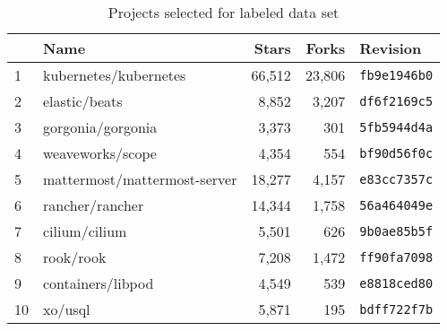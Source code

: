 \begin{table}[htp!]
    \centering
    \caption{Projects selected for labeled data set}
    \label{tbl:dataset-projects}
    \begin{tabular}{llrrl}
    {} & \textbf{Name} &  \textbf{Stars} &  \textbf{Forks} &    \textbf{Revision} \\
    \hline
    1  &         kubernetes/kubernetes &  66,512 &  23,806 &  \texttt{fb9e1946b0} \\
    \rowcolor{verylightgray}
    2  &                 elastic/beats &   8,852 &   3,207 &  \texttt{df6f2169c5} \\
    3  &             gorgonia/gorgonia &   3,373 &     301 &  \texttt{5fb5944d4a} \\
    \rowcolor{verylightgray}
    4  &              weaveworks/scope &   4,354 &     554 &  \texttt{bf90d56f0c} \\
    5  &  mattermost/mattermost-server &  18,277 &   4,157 &  \texttt{e83cc7357c} \\
    \rowcolor{verylightgray}
    6  &               rancher/rancher &  14,344 &   1,758 &  \texttt{56a464049e} \\
    7  &                 cilium/cilium &   5,501 &     626 &  \texttt{9b0ae85b5f} \\
    \rowcolor{verylightgray}
    8  &                     rook/rook &   7,208 &   1,472 &  \texttt{ff90fa7098} \\
    9  &             containers/libpod &   4,549 &     539 &  \texttt{e8818ced80} \\
    \rowcolor{verylightgray}
    10 &                       xo/usql &   5,871 &     195 &  \texttt{bdff722f7b} \\
    \end{tabular}
\end{table}